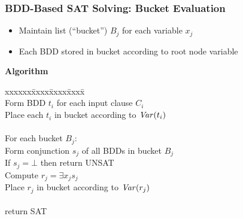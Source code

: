 \documentclass[t,pdf]{beamer}
\begin{document}
\begin{frame}

  \frametitle{BDD-Based SAT Solving: Bucket Evaluation}

  \begin{itemize}
     \item Maintain list (``bucket'') $B_j$ for each variable $x_j$
     \item Each BDD stored in bucket according to root node variable
  \end{itemize}

{\bf Algorithm}
   \begin{tabbing}
     xxxxxx\=xxxx\=xxxx\=xxxx\=\kill
      \\
    \>\>Form BDD $t_i$ for each input clause $C_i$ \\
    \>\>Place each $t_i$ in bucket according to ${\it Var}(t_i)$ \\
\\
  \>For each bucket $B_j$: \\
    \>\>Form conjunction $s_j$ of all BDDs in bucket $B_j$ \\
    \>\>If $s_j = \bot$ then return UNSAT \\
    \>\>Compute $r_j = \exists x_j s_j$ \\
    \>\>Place $r_j$ in bucket according to ${\it Var}(r_j)$ \\
\\
  \>return SAT \\
  \end{tabbing}


\end{frame}
\end{document}

